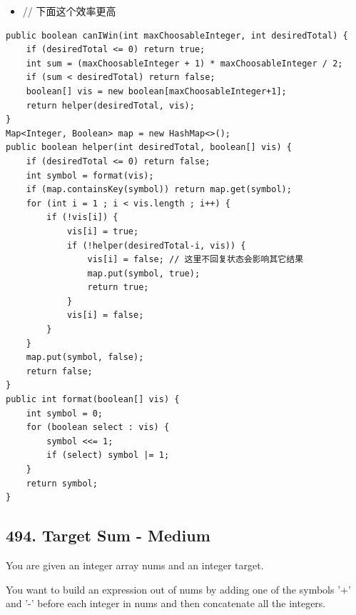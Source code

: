 \documentclass[9pt, b5paaper]{book}
\begin{document}
\begin{itemize}
\item // 下面这个效率更高
\end{itemize}
\begin{verbatim}
public boolean canIWin(int maxChoosableInteger, int desiredTotal) { 
    if (desiredTotal <= 0) return true;
    int sum = (maxChoosableInteger + 1) * maxChoosableInteger / 2;
    if (sum < desiredTotal) return false;
    boolean[] vis = new boolean[maxChoosableInteger+1];
    return helper(desiredTotal, vis);
}
Map<Integer, Boolean> map = new HashMap<>();
public boolean helper(int desiredTotal, boolean[] vis) {
    if (desiredTotal <= 0) return false;
    int symbol = format(vis);
    if (map.containsKey(symbol)) return map.get(symbol);
    for (int i = 1 ; i < vis.length ; i++) {
        if (!vis[i]) {
            vis[i] = true;
            if (!helper(desiredTotal-i, vis)) {
                vis[i] = false; // 这里不回复状态会影响其它结果
                map.put(symbol, true);
                return true;
            }
            vis[i] = false;
        }
    }
    map.put(symbol, false);
    return false;
}
public int format(boolean[] vis) {
    int symbol = 0;
    for (boolean select : vis) {
        symbol <<= 1;
        if (select) symbol |= 1;
    }
    return symbol;
}
\end{verbatim}

\subsection{494. Target Sum - Medium}
\label{sec-1-1-6}
You are given an integer array nums and an integer target.

You want to build an expression out of nums by adding one of the symbols '+' and '-' before each integer in nums and then concatenate all the integers.
\end{document}
